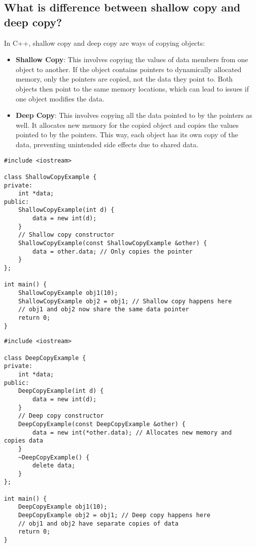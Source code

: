 \subsection{What is difference between shallow copy and deep copy?}
In C++, shallow copy and deep copy are ways of copying objects:
\begin{itemize}
    \item \textbf{Shallow Copy}: This involves copying the values of data members from one object to another. If the object contains pointers to dynamically allocated memory, only the pointers are copied, not the data they point to. Both objects then point to the same memory locations, which can lead to issues if one object modifies the data. 
    \item \textbf{Deep Copy}: This involves copying all the data pointed to by the pointers as well. It allocates new memory for the copied object and copies the values pointed to by the pointers. This way, each object has its own copy of the data, preventing unintended side effects due to shared data.
\end{itemize}
\begin{tcolorbox}[title=Shallow Copy]
\begin{verbatim}
#include <iostream>

class ShallowCopyExample {
private:
    int *data;
public:
    ShallowCopyExample(int d) {
        data = new int(d);
    }
    // Shallow copy constructor
    ShallowCopyExample(const ShallowCopyExample &other) {
        data = other.data; // Only copies the pointer
    }
};

int main() {
    ShallowCopyExample obj1(10);
    ShallowCopyExample obj2 = obj1; // Shallow copy happens here
    // obj1 and obj2 now share the same data pointer
    return 0;
}
\end{verbatim}
\end{tcolorbox}

\begin{tcolorbox}[title=Deep Copy]
\begin{verbatim}
#include <iostream>

class DeepCopyExample {
private:
    int *data;
public:
    DeepCopyExample(int d) {
        data = new int(d);
    }
    // Deep copy constructor
    DeepCopyExample(const DeepCopyExample &other) {
        data = new int(*other.data); // Allocates new memory and copies data
    }
    ~DeepCopyExample() {
        delete data;
    }
};

int main() {
    DeepCopyExample obj1(10);
    DeepCopyExample obj2 = obj1; // Deep copy happens here
    // obj1 and obj2 have separate copies of data
    return 0;
}
\end{verbatim}
\end{tcolorbox}

